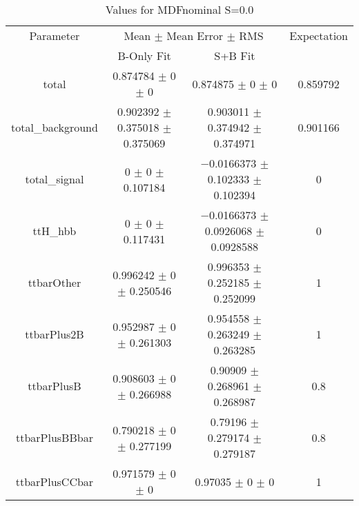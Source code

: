 \begin{table}
\centering
\caption{Values for MDFnominal S=0.0}
\begin{tabular}{cccc}
\toprule
Parameter & \multicolumn{2}{c}{Mean $\pm$ Mean Error $\pm$ RMS} & Expectation\\
 & B-Only Fit & S+B Fit & \\
\midrule
total & \num{0.874784} $\pm$ \num{0} $\pm$ \num{0} & \num{0.874875} $\pm$ \num{0} $\pm$ \num{0} & \num{0.859792}\\
total\_background & \num{0.902392} $\pm$ \num{0.375018} $\pm$ \num{0.375069} & \num{0.903011} $\pm$ \num{0.374942} $\pm$ \num{0.374971} & \num{0.901166}\\
total\_signal & \num{0} $\pm$ \num{0} $\pm$ \num{0.107184} & \num{-0.0166373} $\pm$ \num{0.102333} $\pm$ \num{0.102394} & \num{0}\\
ttH\_hbb & \num{0} $\pm$ \num{0} $\pm$ \num{0.117431} & \num{-0.0166373} $\pm$ \num{0.0926068} $\pm$ \num{0.0928588} & \num{0}\\
ttbarOther & \num{0.996242} $\pm$ \num{0} $\pm$ \num{0.250546} & \num{0.996353} $\pm$ \num{0.252185} $\pm$ \num{0.252099} & \num{1}\\
ttbarPlus2B & \num{0.952987} $\pm$ \num{0} $\pm$ \num{0.261303} & \num{0.954558} $\pm$ \num{0.263249} $\pm$ \num{0.263285} & \num{1}\\
ttbarPlusB & \num{0.908603} $\pm$ \num{0} $\pm$ \num{0.266988} & \num{0.90909} $\pm$ \num{0.268961} $\pm$ \num{0.268987} & \num{0.8}\\
ttbarPlusBBbar & \num{0.790218} $\pm$ \num{0} $\pm$ \num{0.277199} & \num{0.79196} $\pm$ \num{0.279174} $\pm$ \num{0.279187} & \num{0.8}\\
ttbarPlusCCbar & \num{0.971579} $\pm$ \num{0} $\pm$ \num{0} & \num{0.97035} $\pm$ \num{0} $\pm$ \num{0} & \num{1}\\
\bottomrule
\end{tabular}
\end{table}
